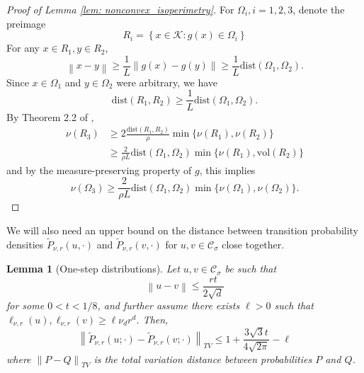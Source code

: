 \documentclass[11pt,twoside]{article}
\newtheorem{lemma}{Lemma}
\newcommand{\set}[1]{\left\{#1\right\}}
\newcommand{\vol}{\mathrm{vol}}
\newcommand{\norm}[1]{\left\lVert#1\right\rVert}
\newcommand{\1}{\mathbf{1}}
\newcommand{\dist}{\mathrm{dist}}
\newcommand{\Cset}{\mathcal{C}}
\newcommand{\Csig}{\Cset_{\sigma}}
\begin{document}
\begin{proof}[Proof of Lemma \ref{lem: nonconvex_isoperimetry}]
	For $\Omega_i, i = 1,2,3$, denote the preimage
	\begin{equation*}
	R_i = \set{x \in \mathcal{K}: g(x) \in \Omega_i}
	\end{equation*}
	For any $x \in R_1, y \in R_2$, 
	\begin{equation*}
	\norm{x - y} \geq \frac{1}{L}\norm{g(x) - g(y)} \geq \frac{1}{L} \dist(\Omega_1, \Omega_2). 
	\end{equation*}
	Since $x \in \Omega_1$ and $y \in \Omega_2$ were arbitrary, we have
	\begin{equation*}
	\dist(R_1, R_2) \geq \frac{1}{L} \dist(\Omega_1, \Omega_2).
	\end{equation*}
	By Theorem 2.2 of \cite{lovasz1990},
	\begin{align*}
	\nu(R_3) & \geq 2\frac{\dist(R_1, R_2)}{\rho} \min \{\nu(R_1), \nu(R_2)\} \\
	& \geq \frac{2}{\rho L} \dist(\Omega_1, \Omega_2) \min\{\nu(R_1), \vol(R_2)\}
	\end{align*}
	and by the measure-preserving property of $g$, this implies
	\begin{equation*}
	\nu(\Omega_3) \geq\frac{2}{\rho L} \dist(\Omega_1, \Omega_2) \min\{\nu(\Omega_1), \nu(\Omega_2)\}.
	\end{equation*}
\end{proof}

We will also need an upper bound on the distance between transition probability densities $\widetilde{P}_{\nu,r}(u,\cdot)$ and $\widetilde{P}_{\nu,r}(v,\cdot)$ for $u,v \in \Csig$ close together. 
\begin{lemma}[One-step distributions]
	\label{lem: one_step_distributions}
	Let $u,v \in \Csig$ be such that 
	\begin{equation*}
	\norm{u - v} \leq \frac{r t}{2\sqrt{d}}
	\end{equation*}
	for some $0 < t < 1/8$, and further assume there exists $\ell > 0$ such that $\ell_{\nu,r}(u), \ell_{\nu,r}(v) \geq \ell \nu_d r^d$. Then,
	\begin{equation*}
	\norm{\widetilde{P}_{\nu,r}(u; \cdot) - \widetilde{P}_{\nu,r}(v; \cdot)}_{TV} \leq 1 + \frac{3 \sqrt{3} t}{4\sqrt{2\pi}} - \ell
	\end{equation*}
	where $\norm{P - Q}_{TV}$ is the total variation distance between probabilities $P$ and $Q$. 
\end{lemma}
\end{document}

